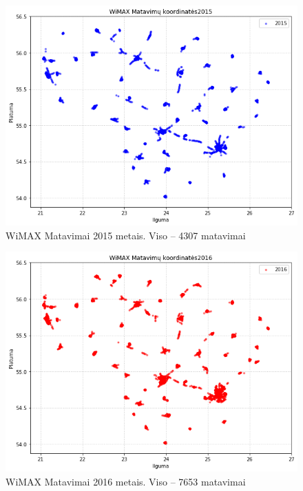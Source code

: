 \documentclass{VUMIFPSbakalaurinis}
\begin{document}
\begin{figure}[H]
	\centering
	\includegraphics[scale=0.5]{img/WiMAX-1}
	\caption{WiMAX Matavimai 2015 metais. Viso – 4307 matavimai}
	\label{img:WiMAX-1}
\end{figure}
\begin{figure}[H]
	\centering
	\includegraphics[scale=0.5]{img/WiMAX-2}
	\caption{WiMAX Matavimai 2016 metais. Viso – 7653 matavimai}
	\label{img:WiMAX-2}
\end{figure}
\end{document}
